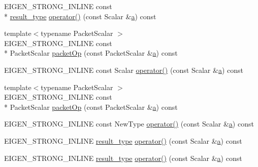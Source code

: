 \begin{DoxyCompactItemize}
\item 
E\-I\-G\-E\-N\-\_\-\-S\-T\-R\-O\-N\-G\-\_\-\-I\-N\-L\-I\-N\-E const \\*
\hyperlink{struct_e_i_g_e_n___e_m_p_t_y___s_t_r_u_c_t_a99f2ce1c1dfd4e7ff53eadc336c7816e}{result\-\_\-type} \hyperlink{struct_e_i_g_e_n___e_m_p_t_y___s_t_r_u_c_t_a12e31e631e2352868d139bfda0bce554}{operator()} (const Scalar \&\hyperlink{glext_8h_ac8729153468b5dcf13f971b21d84d4e5}{a}) const 
\item 
{\footnotesize template$<$typename Packet\-Scalar $>$ }\\E\-I\-G\-E\-N\-\_\-\-S\-T\-R\-O\-N\-G\-\_\-\-I\-N\-L\-I\-N\-E const \\*
Packet\-Scalar \hyperlink{struct_e_i_g_e_n___e_m_p_t_y___s_t_r_u_c_t_a723d699442d382469360bdbfca26ccd7}{packet\-Op} (const Packet\-Scalar \&\hyperlink{glext_8h_ac8729153468b5dcf13f971b21d84d4e5}{a}) const 
\item 
E\-I\-G\-E\-N\-\_\-\-S\-T\-R\-O\-N\-G\-\_\-\-I\-N\-L\-I\-N\-E const Scalar \hyperlink{struct_e_i_g_e_n___e_m_p_t_y___s_t_r_u_c_t_a1e4ade9f4624b72ae44dc006194c5306}{operator()} (const Scalar \&\hyperlink{glext_8h_ac8729153468b5dcf13f971b21d84d4e5}{a}) const 
\item 
{\footnotesize template$<$typename Packet\-Scalar $>$ }\\E\-I\-G\-E\-N\-\_\-\-S\-T\-R\-O\-N\-G\-\_\-\-I\-N\-L\-I\-N\-E const \\*
Packet\-Scalar \hyperlink{struct_e_i_g_e_n___e_m_p_t_y___s_t_r_u_c_t_a723d699442d382469360bdbfca26ccd7}{packet\-Op} (const Packet\-Scalar \&\hyperlink{glext_8h_ac8729153468b5dcf13f971b21d84d4e5}{a}) const 
\item 
E\-I\-G\-E\-N\-\_\-\-S\-T\-R\-O\-N\-G\-\_\-\-I\-N\-L\-I\-N\-E const New\-Type \hyperlink{struct_e_i_g_e_n___e_m_p_t_y___s_t_r_u_c_t_aef9f9f42afdcbcac03df6e10898e2447}{operator()} (const Scalar \&\hyperlink{glext_8h_ac8729153468b5dcf13f971b21d84d4e5}{a}) const 
\item 
E\-I\-G\-E\-N\-\_\-\-S\-T\-R\-O\-N\-G\-\_\-\-I\-N\-L\-I\-N\-E \hyperlink{struct_e_i_g_e_n___e_m_p_t_y___s_t_r_u_c_t_a99f2ce1c1dfd4e7ff53eadc336c7816e}{result\-\_\-type} \hyperlink{struct_e_i_g_e_n___e_m_p_t_y___s_t_r_u_c_t_ad73ed249c648ab4443fe5d68a9c284b2}{operator()} (const Scalar \&\hyperlink{glext_8h_ac8729153468b5dcf13f971b21d84d4e5}{a}) const 
\item 
E\-I\-G\-E\-N\-\_\-\-S\-T\-R\-O\-N\-G\-\_\-\-I\-N\-L\-I\-N\-E \hyperlink{struct_e_i_g_e_n___e_m_p_t_y___s_t_r_u_c_t_a99f2ce1c1dfd4e7ff53eadc336c7816e}{result\-\_\-type} \hyperlink{struct_e_i_g_e_n___e_m_p_t_y___s_t_r_u_c_t_ad73ed249c648ab4443fe5d68a9c284b2}{operator()} (const Scalar \&\hyperlink{glext_8h_ac8729153468b5dcf13f971b21d84d4e5}{a}) const 

\end{DoxyCompactItemize}
